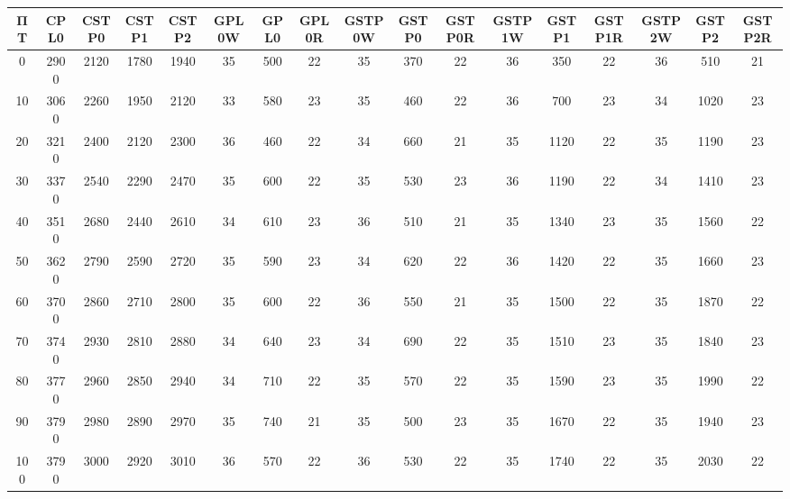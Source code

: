 \begin{tabular}{|c|c|c|c|c|c|c|c|c|c|c|c|c|c|c|c|c|}
\hline
ΠΤ&CPL0&CSTP0&CSTP1&CSTP2&GPL0W&GPL0&GPL0R&GSTP0W&GSTP0&GSTP0R&GSTP1W&GSTP1&GSTP1R&GSTP2W&GSTP2&GSTP2R\\\hline
\hline
0&2900&2120&1780&1940&35&500&22&35&370&22&36&350&22&36&510&21\\
\hline
10&3060&2260&1950&2120&33&580&23&35&460&22&36&700&23&34&1020&23\\
\hline
20&3210&2400&2120&2300&36&460&22&34&660&21&35&1120&22&35&1190&23\\
\hline
30&3370&2540&2290&2470&35&600&22&35&530&23&36&1190&22&34&1410&23\\
\hline
40&3510&2680&2440&2610&34&610&23&36&510&21&35&1340&23&35&1560&22\\
\hline
50&3620&2790&2590&2720&35&590&23&34&620&22&36&1420&22&35&1660&23\\
\hline
60&3700&2860&2710&2800&35&600&22&36&550&21&35&1500&22&35&1870&22\\
\hline
70&3740&2930&2810&2880&34&640&23&34&690&22&35&1510&23&35&1840&23\\
\hline
80&3770&2960&2850&2940&34&710&22&35&570&22&35&1590&23&35&1990&22\\
\hline
90&3790&2980&2890&2970&35&740&21&35&500&23&35&1670&22&35&1940&23\\
\hline
100&3790&3000&2920&3010&36&570&22&36&530&22&35&1740&22&35&2030&22\\
\hline
\end{tabular}
